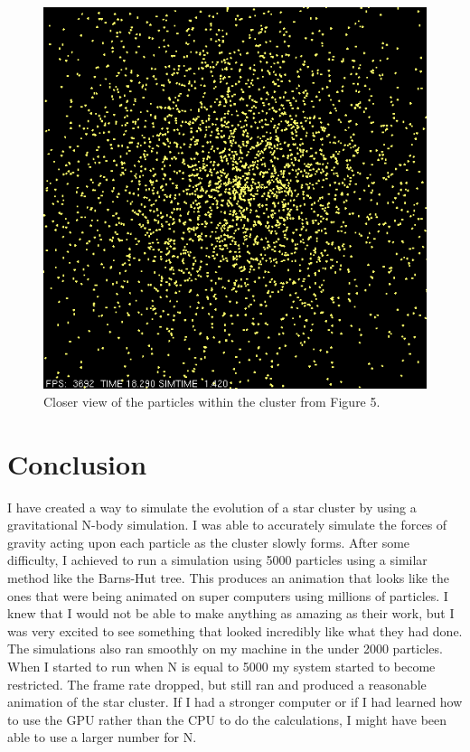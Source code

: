 \documentclass{egpubl}
\begin{document}
\begin{figure}[H]
  \centering
  \includegraphics[width=.5\linewidth]{Screen_Caps/5000ptk_100_and_X_4_ZOOM.png}
  \caption{\label{fig:Fig5}
           Closer view of the particles within the cluster from Figure 5.}
\end{figure}

\section{Conclusion}

I have created a way to simulate the evolution of a star cluster by using a gravitational N-body simulation. I was able to accurately simulate the forces of gravity acting upon each particle as the cluster slowly forms. After some difficulty, I achieved to run a simulation using 5000 particles using a similar method like the Barns-Hut tree. This produces an animation that looks like the ones that were being animated on super computers using millions of particles. I knew that I would not be able to make anything as amazing as their work, but I was very excited to see something that looked incredibly like what they had done. The simulations also ran smoothly on my machine in the under 2000 particles. When I started to run when N is equal to 5000 my system started to become restricted. The frame rate dropped, but still ran and produced a reasonable animation of the star cluster. If I had a stronger computer or if I had learned how to use the GPU rather than the CPU to do the calculations, I might have been able to use a larger number for N.
\end{document}
